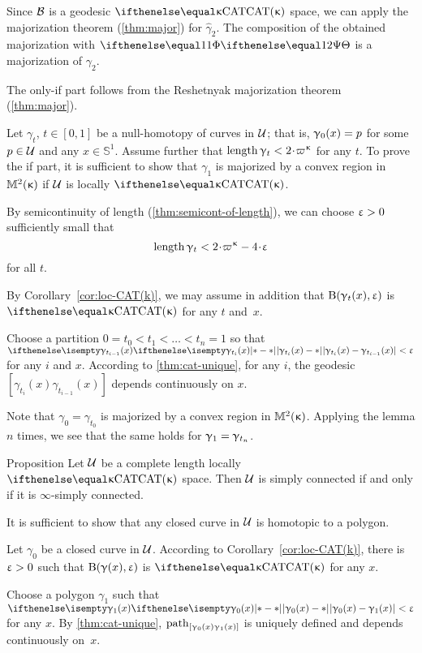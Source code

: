 Since $\mathcal{B}$ is a geodesic $\CAT\kappa$ space, we can apply the majorization theorem (\ref{thm:major}) for $\hat\gamma_2$.
The composition of the obtained majorization with $\map$ is a majorization of $\gamma_2$.
\qeds

The only-if part follows from the Reshetnyak majorization theorem (\ref{thm:major}).

Let  $\gamma_t$, $t\in[0,1]$ 
be a null-homotopy of curves in $\mathcal{U}$;
that is, $\gamma_0(x)\z=p$ for some $p\in \spc{U}$
and any $x\in\mathbb{S}^1$.
Assume further that $\length \gamma_t\z<2\cdot\varpi\kappa$ for any $t$.
To prove the if part, it is sufficient to show that $\gamma_1$ is majorized by a convex region in $\mathbb{M}_{{}}^{2}({\upkappa})$ if $\mathcal{U}$ is locally $\CAT\kappa$. 

By semicontinuity of length (\ref{thm:semicont-of-length}),
we can choose  $\upvarepsilon>0$ sufficiently small that
$$\length \gamma_t<2\cdot\varpi\kappa-4\cdot\eps$$
for all $t$.

By Corollary~\ref{cor:loc-CAT(k)},
we may assume in addition that
$\mathrm{B}{}(\upgamma_t(x),\upvarepsilon)$ is $\CAT\kappa$ 
for any $t$ and~$x$.

Choose a partition $0=t_0<t_1<\dots<t_n=1$
so that $\dist{\gamma_{t_i}(x)}{\gamma_{t_{i-1}}(x)}{}<\eps$
for any $i$ and $x$.
According to \ref{thm:cat-unique},
for any $i$,
the geodesic $[\gamma_{t_i}(x)\gamma_{t_{i-1}}(x)]$ depends continuously on $x$.

Note that $\gamma_0=\gamma_{t_0}$ is majorized by a convex region in $\mathbb{M}_{{}}^{2}({\upkappa})$.
Applying the lemma $n$ times, we see that the same holds for $\gamma_1\z=\gamma_{t_n}$.
\qeds

\begin{thm}{Proposition}\label{prop:sc}
Let $\mathcal{U}$ be a complete length locally $\CAT\kappa$ space.
Then $\mathcal{U}$ is simply connected if and only if it is $\infty$-simply connected.
\end{thm}

It is sufficient to show that any closed curve in $\mathcal{U}$ is homotopic to a polygon.

Let $\gamma_0$ be a closed curve in $\mathcal{U}$.
According to Corollary~\ref{cor:loc-CAT(k)},
there is $\upvarepsilon>0$ such that 
$\mathrm{B}{}(\upgamma(x),\upvarepsilon)$ is $\CAT\kappa$
for any $x$.

Choose a polygon $\gamma_1$ such that $\dist{\gamma_0(x)}{\gamma_1(x)}{}<\eps$ for any $x$.
By \ref{thm:cat-unique}, 
$\mathrm{path}_{[\upgamma_0(x)\upgamma_1(x)]}$ 
is uniquely defined 
and depends continuously on~$x$.


